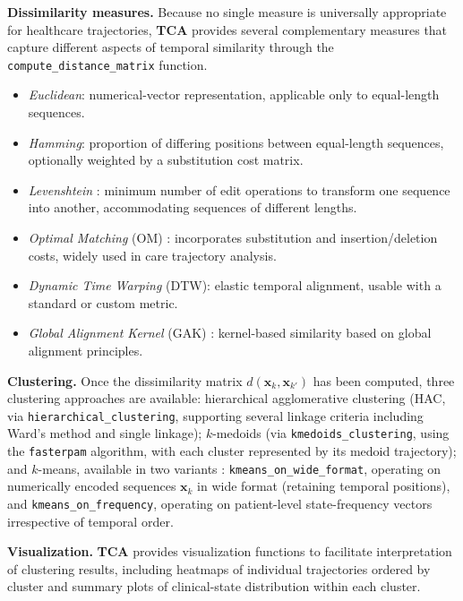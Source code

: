 \documentclass[a4paper]{cas-sc}
\newcommand{\code}[1]{\texttt{#1}}
\newcommand{\pkg}[1]{\textbf{#1}}
\begin{document}
\textbf{Dissimilarity measures.}
Because no single measure is universally appropriate for healthcare trajectories, \pkg{TCA} provides several complementary measures that capture different aspects of temporal similarity through the \code{compute\_distance\_matrix} function.
\begin{itemize}
  \item \emph{Euclidean}: numerical-vector representation, applicable only to equal-length sequences.
  \item \emph{Hamming}: proportion of differing positions between equal-length sequences, optionally weighted by a substitution cost matrix.
  \item \emph{Levenshtein} \citep{levenshtein1966binary}: minimum number of edit operations to transform one sequence into another, accommodating sequences of different lengths.
  \item \emph{Optimal Matching} (OM) \citep{andjohn1986optimal}: incorporates substitution and insertion/deletion costs, widely used in care trajectory analysis.
  \item \emph{Dynamic Time Warping} (DTW): elastic temporal alignment, usable with a standard or custom metric.
  \item \emph{Global Alignment Kernel} (GAK) \citep{denteuling2026clustering}: kernel-based similarity based on global alignment principles.
\end{itemize}

\textbf{Clustering.}
Once the dissimilarity matrix $d(\boldsymbol{x}_k,\boldsymbol{x}_{k'})$ has been computed, three clustering approaches are available: 
hierarchical agglomerative clustering (HAC, via \code{hierarchical\_clustering}, supporting several linkage criteria including Ward's method and single linkage); 
$k$-medoids \citep{denteuling2026clustering} (via \code{kmedoids\_clustering}, using the \code{fasterpam} algorithm, with each cluster represented by its medoid trajectory); 
and $k$-means, available in two variants : \code{kmeans\_on\_wide\_format}, operating on numerically encoded sequences $\boldsymbol{x}_k$ in wide format (retaining temporal positions), 
and \code{kmeans\_on\_frequency}, operating on patient-level state-frequency vectors irrespective of temporal order.

\textbf{Visualization.}
\pkg{TCA} provides visualization functions to facilitate interpretation of clustering results, including heatmaps of individual trajectories ordered by cluster and summary plots of clinical-state distribution within each cluster.
\end{document}
